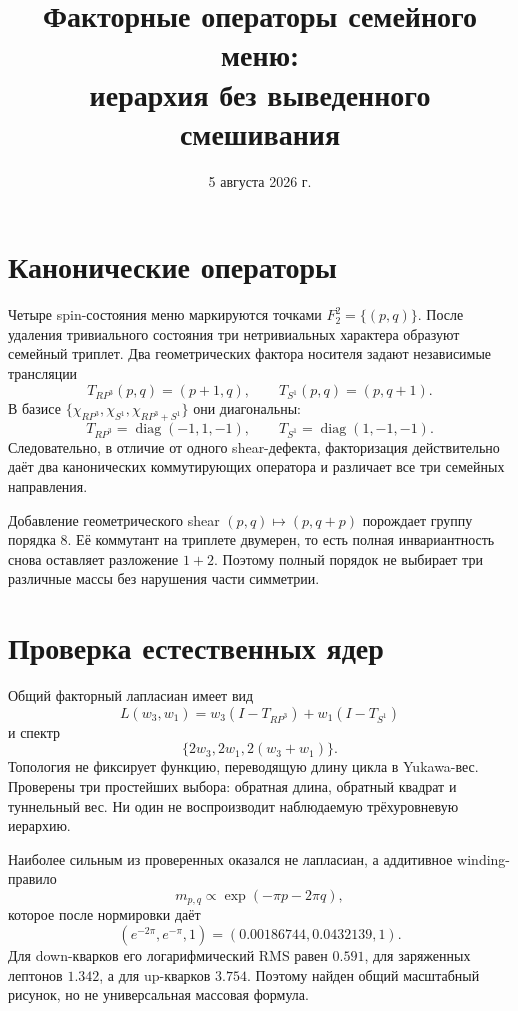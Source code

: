 \documentclass[12pt,a4paper]{article}
\title{Факторные операторы семейного меню:\\
иерархия без выведенного смешивания}
\author{}
\date{5 августа 2026 г.}
\begin{document}
\maketitle

\section{Канонические операторы}

Четыре spin-состояния меню маркируются точками
$F_2^2=\{(p,q)\}$. После удаления тривиального состояния три нетривиальных
характера образуют семейный триплет. Два геометрических фактора носителя
задают независимые трансляции
\begin{equation}
 T_{RP^3}(p,q)=(p+1,q),
 \qquad
 T_{S^1}(p,q)=(p,q+1).
\end{equation}
В базисе
$\{\chi_{RP^3},\chi_{S^1},\chi_{RP^3+S^1}\}$ они диагональны:
\begin{equation}
 T_{RP^3}=\operatorname{diag}(-1,1,-1),
 \qquad
 T_{S^1}=\operatorname{diag}(1,-1,-1).
\end{equation}
Следовательно, в отличие от одного shear-дефекта, факторизация действительно
даёт два канонических коммутирующих оператора и различает все три семейных
направления.

Добавление геометрического shear
$(p,q)\mapsto(p,q+p)$ порождает группу порядка $8$. Её коммутант на триплете
двумерен, то есть полная инвариантность снова оставляет разложение $1+2$.
Поэтому полный порядок не выбирает три различные массы без нарушения части
симметрии.

\section{Проверка естественных ядер}

Общий факторный лапласиан имеет вид
\begin{equation}
 L(w_3,w_1)=w_3(I-T_{RP^3})+w_1(I-T_{S^1})
\end{equation}
и спектр
\begin{equation}
 \{2w_3,2w_1,2(w_3+w_1)\}.
\end{equation}
Топология не фиксирует функцию, переводящую длину цикла в Yukawa-вес.
Проверены три простейших выбора: обратная длина, обратный квадрат и
туннельный вес. Ни один не воспроизводит наблюдаемую трёхуровневую иерархию.

Наиболее сильным из проверенных оказался не лапласиан, а аддитивное winding-
правило
\begin{equation}
 m_{p,q}\propto \exp(-\pi p-2\pi q),
\end{equation}
которое после нормировки даёт
\begin{equation}
 (e^{-2\pi},e^{-\pi},1)
 =(0.00186744,0.0432139,1).
\end{equation}
Для down-кварков его логарифмический RMS равен $0.591$, для заряженных
лептонов $1.342$, а для up-кварков $3.754$. Поэтому найден общий масштабный
рисунок, но не универсальная массовая формула.
\end{document}
